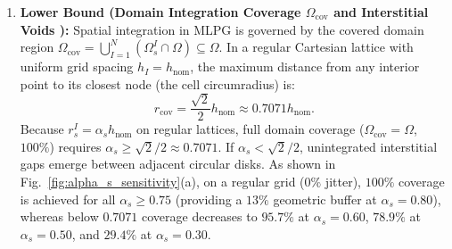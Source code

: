 \documentclass[VANCOUVER,Times1COL]{WileyNJD-v5}
\begin{document}
\begin{enumerate}
    \item \textbf{Lower Bound (Domain Integration Coverage $\Omega_{\mathrm{cov}}$ and Interstitial Voids \cite{atluri2002meshless, liu2009mesh}):} Spatial integration in MLPG is governed by the covered domain region $\Omega_{\mathrm{cov}} = \bigcup_{I=1}^N (\Omega_s^I \cap \Omega) \subseteq \Omega$. In a regular Cartesian lattice with uniform grid spacing $h_I = h_{\mathrm{nom}}$, the maximum distance from any interior point to its closest node (the cell circumradius) is:
          \begin{equation}
              r_{\mathrm{cov}} = \frac{\sqrt{2}}{2} h_{\mathrm{nom}} \approx 0.7071 h_{\mathrm{nom}}.
              \label{eq:alpha_s_lower_bound}
          \end{equation}
          Because $r_s^I = \alpha_s h_{\mathrm{nom}}$ on regular lattices, full domain coverage ($\Omega_{\mathrm{cov}} = \Omega$, $100\%$) requires $\alpha_s \ge \sqrt{2}/2 \approx 0.7071$. If $\alpha_s < \sqrt{2}/2$, unintegrated interstitial gaps emerge between adjacent circular disks. As shown in Fig.~\ref{fig:alpha_s_sensitivity}(a), on a regular grid ($0\%$ jitter), $100\%$ coverage is achieved for all $\alpha_s \ge 0.75$ (providing a $13\%$ geometric buffer at $\alpha_s = 0.80$), whereas below $0.7071$ coverage decreases to $95.7\%$ at $\alpha_s = 0.60$, $78.9\%$ at $\alpha_s = 0.50$, and $29.4\%$ at $\alpha_s = 0.30$.
          

\end{enumerate}
\end{document}
